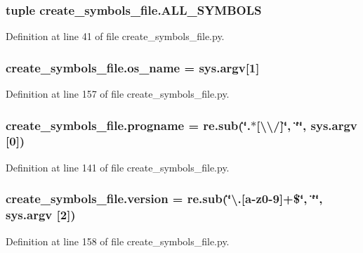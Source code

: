 \subsubsection[{\texorpdfstring{A\+L\+L\+\_\+\+S\+Y\+M\+B\+O\+LS}{ALL_SYMBOLS}}]{\setlength{\rightskip}{0pt plus 5cm}tuple create\+\_\+symbols\+\_\+file.\+A\+L\+L\+\_\+\+S\+Y\+M\+B\+O\+LS}\hypertarget{namespacecreate__symbols__file_a83c887fcaee76a681e956ffda164e2d6}{}\label{namespacecreate__symbols__file_a83c887fcaee76a681e956ffda164e2d6}


Definition at line 41 of file create\+\_\+symbols\+\_\+file.\+py.

\subsubsection[{\texorpdfstring{os\+\_\+name}{os_name}}]{\setlength{\rightskip}{0pt plus 5cm}create\+\_\+symbols\+\_\+file.\+os\+\_\+name = {\bf sys.\+argv}\mbox{[}1\mbox{]}}\hypertarget{namespacecreate__symbols__file_ab8c6d58818e94ccbf7184eac90e288b3}{}\label{namespacecreate__symbols__file_ab8c6d58818e94ccbf7184eac90e288b3}


Definition at line 157 of file create\+\_\+symbols\+\_\+file.\+py.

\subsubsection[{\texorpdfstring{progname}{progname}}]{\setlength{\rightskip}{0pt plus 5cm}create\+\_\+symbols\+\_\+file.\+progname = re.\+sub(\char`\"{}.$\ast$\mbox{[}\textbackslash{}\textbackslash{}/\mbox{]}\char`\"{}, \char`\"{}\char`\"{}, {\bf sys.\+argv} \mbox{[}0\mbox{]})}\hypertarget{namespacecreate__symbols__file_a731257e83bedb555f221c927882e19d1}{}\label{namespacecreate__symbols__file_a731257e83bedb555f221c927882e19d1}


Definition at line 141 of file create\+\_\+symbols\+\_\+file.\+py.

\subsubsection[{\texorpdfstring{version}{version}}]{\setlength{\rightskip}{0pt plus 5cm}create\+\_\+symbols\+\_\+file.\+version = re.\+sub(\char`\"{}\textbackslash{}.\mbox{[}a-\/z0-\/9\mbox{]}+\$\char`\"{}, \char`\"{}\char`\"{}, sys.\+argv \mbox{[}2\mbox{]})}\hypertarget{namespacecreate__symbols__file_a5772cb48a48cba8b721477bec16479ea}{}\label{namespacecreate__symbols__file_a5772cb48a48cba8b721477bec16479ea}


Definition at line 158 of file create\+\_\+symbols\+\_\+file.\+py.

